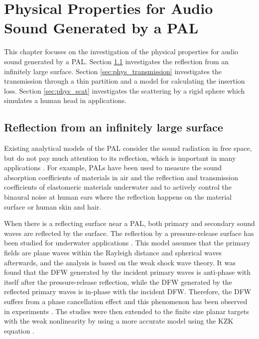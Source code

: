 \chapter{Physical Properties for Audio Sound Generated by a PAL} %
\label{chap:phys} %


\noindent This chapter focuses on the investigation of the physical properties for audio sound generated by a PAL.
Section \ref{sec:phys_reflection} investigates the reflection from an infinitely large surface.
Section \ref{sec:phys_transmission} investigates the transmission through a thin partition and a model for calculating the insertion loss.
Section \ref{sec:phys_scat} investigates the scattering by a rigid sphere which simulates a human head in applications.



\section{Reflection from an infinitely large surface}
\label{sec:phys_reflection}
Existing analytical models of the PAL consider the sound radiation in free space, but do not pay much attention to its reflection, which is important in many applications \cite{HolosonicsResearchLabs2016UserManualAudio}.
For example, PALs have been used to measure the sound absorption coefficients of materials in air \cite{Castagnede2008LowFrequencySitu, Sugahara2019MeasurementsAcousticImpedance, Romanova2019ApplicationParametricTransducer}
and the reflection and transmission coefficients of elastomeric materials underwater \cite{Humphrey1985MeasurementAcousticProperties, Humphrey2008AcousticCharacterizationPanel}
and to actively control the binaural noise at human ears \cite{Tanaka2017BinauralActiveNoise} where the reflection happens on the material surface or human skin and hair.

When there is a reflecting surface near a PAL, both primary and secondary sound waves are reflected by the surface. 
The reflection by a pressure-release surface has been studied for underwater applications \cite{Muir1977ReflectionFiniteAmplitude}.
This model assumes that the primary fields are plane waves within the Rayleigh distance and spherical waves afterwards, and the analysis is based on the weak shock wave theory. 
It was found that the DFW generated by the incident primary waves is anti-phase with itself after the pressure-release reflection, while the DFW generated by the reflected primary waves is in-phase with the incident DFW. 
Therefore, the DFW suffers from a phase cancellation effect and this phenomenon has been observed in experiments \cite{Muir1977ReflectionFiniteAmplitude}.
The studies were then extended to the finite size planar targets with the weak nonlinearity by using a more accurate model {using the KZK equation} \cite{Garrett1984ReflectionParametricRadiation}.

